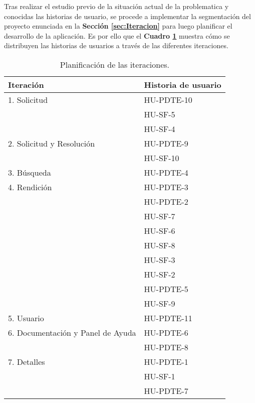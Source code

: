 Tras realizar el estudio previo de la situación actual de la problematica y conocidas las historias de usuario, se procede a implementar la segmentación del proyecto enunciada en la \textbf{Sección \ref{sec:Iteracion}} para luego planificar el desarrollo de la aplicación. Es por ello que el \textbf{Cuadro \ref{tab: tab_planificacion}} muestra cómo se distribuyen las historias de usuarios a través de las diferentes iteraciones.


\begin{table}[htbp]
    
    \caption{\label{tab: tab_planificacion} Planificación de las iteraciones. }
	\footnotesize
	\centering
    \begin{tabular}{|l|l|}
    
    	\hline
    	\textbf{Iteración} & \textbf{Historia de usuario} \\
    	\hline\hline
    
		1. Solicitud	& 	HU-PDTE-10\\ \cline{2-2}
					&	HU-SF-5 \\ \cline{2-2}
					&	HU-SF-4 \\ \hline

		2. Solicitud y Resolución	& 	HU-PDTE-9\\ \cline{2-2}
					&	HU-SF-10 \\ \hline
					
		3. Búsqueda	& 	HU-PDTE-4 \\ \hline

		4. Rendición	& 	HU-PDTE-3\\ \cline{2-2}
					&	HU-PDTE-2 \\ \cline{2-2}
					&	HU-SF-7 \\ \cline{2-2}
					&	HU-SF-6 \\ \cline{2-2}
					&	HU-SF-8 \\ \cline{2-2}
					&	HU-SF-3 \\ \cline{2-2}
					&	HU-SF-2 \\ \cline{2-2}
					&	HU-PDTE-5 \\ \cline{2-2}
					&	HU-SF-9 \\ \hline

		5. Usuario	& 	HU-PDTE-11 \\ \hline
		
		6. Documentación y Panel de Ayuda	& 	HU-PDTE-6\\ \cline{2-2}
					&	HU-PDTE-8 \\ \hline

		7. Detalles	& 	HU-PDTE-1\\ \cline{2-2}
					&	HU-SF-1 \\ \cline{2-2}
					&	HU-PDTE-7 \\ \hline
    \end{tabular}  
\end{table}